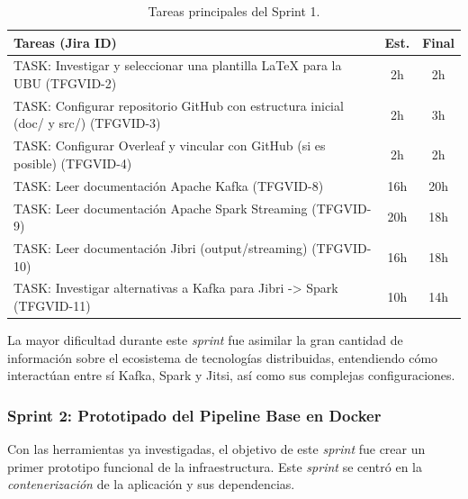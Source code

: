 \begin{table}[H]
    \centering
    \begin{tabular}{|p{}|c|c|}
        \hline
        \rowcolor[HTML]{EFEFEF} 
        \textbf{Tareas (Jira ID)} & \textbf{Est.} & \textbf{Final} \\ \hline
        \rowcolor[HTML]{ECF4FF} 
        TASK: Investigar y seleccionar una plantilla \LaTeX{} para la UBU (TFGVID-2) & 2h & 2h \\
        \rowcolor[HTML]{EFEFEF} 
        TASK: Configurar repositorio GitHub con estructura inicial (doc/ y src/) (TFGVID-3) & 2h & 3h \\
        \rowcolor[HTML]{ECF4FF} 
        TASK: Configurar Overleaf y vincular con GitHub (si es posible) (TFGVID-4) & 2h & 2h \\
        \rowcolor[HTML]{EFEFEF} 
        TASK: Leer documentación Apache Kafka (TFGVID-8) & 16h & 20h \\
        \rowcolor[HTML]{ECF4FF} 
        TASK: Leer documentación Apache Spark Streaming (TFGVID-9) & 20h & 18h \\
        \rowcolor[HTML]{EFEFEF} 
        TASK: Leer documentación Jibri (output/streaming) (TFGVID-10) & 16h & 18h \\
        \rowcolor[HTML]{ECF4FF} 
        TASK: Investigar alternativas a Kafka para Jibri -> Spark (TFGVID-11) & 10h & 14h \\
        \hline
    \end{tabular}
    \caption{Tareas principales del Sprint 1.}
    \label{tab:sprint1}
\end{table}

La mayor dificultad durante este \textit{sprint} fue asimilar la gran cantidad de información sobre el ecosistema de tecnologías distribuidas, entendiendo cómo interactúan entre sí Kafka, Spark y Jitsi, así como sus complejas configuraciones.

\subsubsection{Sprint 2: Prototipado del Pipeline Base en Docker}
Con las herramientas ya investigadas, el objetivo de este \textit{sprint} fue crear un primer prototipo funcional de la infraestructura. Este \textit{sprint} se centró en la \textit{contenerización} de la aplicación y sus dependencias.

